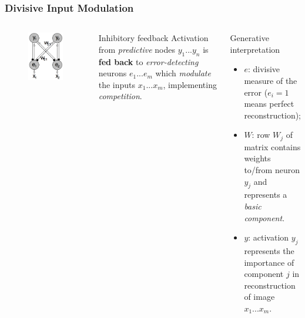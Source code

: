 \documentclass{beamer}
\begin{document}
			\begin{frame}
				\frametitle{Divisive Input Modulation}  
				\begin{columns}[c]
						\begin{figure}[h]
							\centering
							\includegraphics[width=\textwidth]{dim}
						\end{figure}
					    \begin{block}{Inhibitory feedback}
					    	Activation from \emph{predictive} nodes $y_1 ... y_n$ is \textbf{fed back} to \emph{error-detecting} neurons $e_1 ... e_m$ which \emph{modulate} the inputs $x_1 ... x_m$, implementing \emph{competition}.
					    \end{block}
					    \begin{block}{Generative interpretation}
					    	\small{\begin{itemize}
					    		\item $e$: divisive measure of the error ($e_i = 1$ means perfect reconstruction);
					    		\item $W$: row $W_j$ of matrix contains weights to/from neuron $y_j$ and represents a \emph{basic component}.
					    		\item $y$: activation $y_j$ represents the importance of component $j$ in reconstruction of image $x_1 ... x_m$.
					    	\end{itemize}}
					    \end{block}
				\end{columns}
			\end{frame}
		
\end{document}
